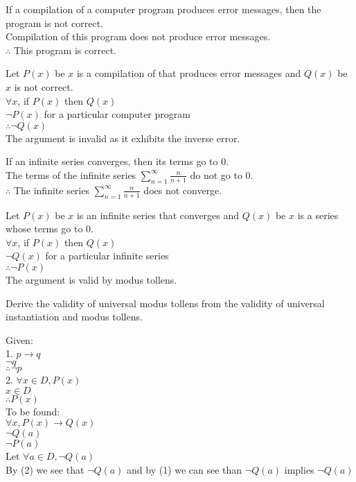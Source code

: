 \documentclass[12pt,letterpaper, onecolumn]{exam}
\begin{document}
\begin{questions}
	\question If a compilation of a computer program produces error messages, then the program is not correct. \\
	Compilation of this program does not produce error messages.\\
	$\therefore$ This program is correct.
	\begin{solution}
		Let $P(x)$ be $x$ is a compilation of that produces error messages and $Q(x)$ be $x$ is not correct.\\
		$\forall x$, if $P(x)$ then $Q(x)$\\
		$\neg P(x)$ for a particular computer program\\
		$\therefore \neg Q(x)$\\
		The argument is invalid as it exhibits the inverse error.
	\end{solution}
	
	\question If an infinite series converges, then its terms go to 0. \\
	The terms of the infinite series $\sum_{n=1}^{\infty} \frac{n}{n+1}$ do not go to 0.\\
	$\therefore$ The infinite series $\sum_{n=1}^{\infty} \frac{n}{n+1}$ does not converge.
	\begin{solution}
		Let $P(x)$ be $x$ is an infinite series that converges and $Q(x)$ be $x$ is a series whose terms go to 0.\\
		$\forall x$, if $P(x)$ then $Q(x)$\\
		$\neg Q(x)$ for a particular infinite series\\
		$\therefore \neg P(x)$\\
		The argument is valid by modus tollens.
	\end{solution}
	\question Derive the validity of universal modus tollens from the validity of universal instantiation and modus tollens.
	\begin{solution}
		Given:\\
		1. $p \longrightarrow q$\\
		$\neg q$\\
		$\therefore \neg p$\\
		2. $\forall x \in D, P(x)$\\
		$x \in D$\\
		$\therefore P(x)$\\
		To be found:\\
		$\forall x, P(x) \longrightarrow Q(x)$\\
		$\neg Q(a)$\\
		$\neg P(a)$\\
		
		Let $\forall a \in D, \neg Q(a)$\\
		By (2) we see that $\neg Q(a)$ and by (1) we can see than $\neg Q(a)$ implies $\neg Q(a)$
		 
	\end{solution}
\end{questions}
\end{document}
